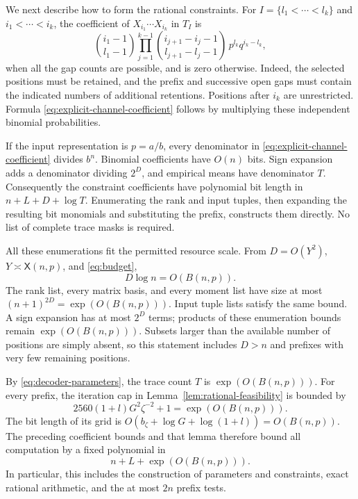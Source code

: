 We next describe how to form the rational constraints.  For
\(I=\{l_1<\cdots<l_k\}\) and \(i_1<\cdots<i_k\), the coefficient
of \(X_{i_1}\cdots X_{i_k}\) in \(T_I\) is
\begin{equation}\label{eq:explicit-channel-coefficient}
 \binom{i_1-1}{l_1-1}
 \prod_{j=1}^{k-1}
 \binom{i_{j+1}-i_j-1}{l_{j+1}-l_j-1}
 \,p^{l_k}q^{i_k-l_k},
\end{equation}
when all the gap counts are possible, and is zero otherwise.
Indeed, the selected positions must be retained, and the prefix and
successive open gaps must contain the indicated numbers of additional
retentions.  Positions after \(i_k\) are unrestricted.  Formula
\eqref{eq:explicit-channel-coefficient} follows by multiplying these
independent binomial probabilities.

If the input representation is \(p=a/b\), every denominator in
\eqref{eq:explicit-channel-coefficient} divides \(b^n\).
Binomial coefficients have \(O(n)\) bits.  Sign expansion adds a
denominator dividing \(2^D\), and empirical means have denominator
\(T\).  Consequently the constraint coefficients have polynomial
bit length in \(n+L+D+\log T\).  Enumerating the rank and input tuples,
then expanding the resulting bit monomials and substituting the
prefix, constructs them directly.  No list of complete trace masks
is required.

All these enumerations fit the permitted resource scale.  From
\(D=O(Y^2)\), \(Y\asymp\mathsf X(n,p)\), and \eqref{eq:budget},
\begin{equation}\label{eq:decoder-size-bound}
 D\log n=O(B(n,p)).
\end{equation}
The rank list, every matrix basis, and every moment list have size
at most \((n+1)^{2D}=\exp(O(B(n,p)))\).  Input tuple lists satisfy the
same bound.  A sign expansion has at most \(2^D\) terms; products
of these enumeration bounds remain \(\exp(O(B(n,p)))\).  Subsets
larger than the available number of positions are simply absent,
so this statement includes \(D>n\) and prefixes with very few
remaining positions.

By \eqref{eq:decoder-parameters}, the trace count \(T\) is
\(\exp(O(B(n,p)))\).  For every prefix, the iteration cap in
Lemma~\ref{lem:rational-feasibility} is bounded by
\[
 2560(1+l)G^2\zeta^{-2}+1=\exp(O(B(n,p))).
\]
The bit length of its grid is
\(O(b_\zeta+\log G+\log(1+l))=O(B(n,p))\).
The preceding coefficient bounds and that lemma therefore bound
all computation by a fixed polynomial in
\begin{equation}\label{eq:decoder-total-resource}
 n+L+\exp(O(B(n,p))).
\end{equation}
In particular, this includes the construction of parameters and
constraints, exact rational arithmetic, and the at most \(2n\)
prefix tests.

